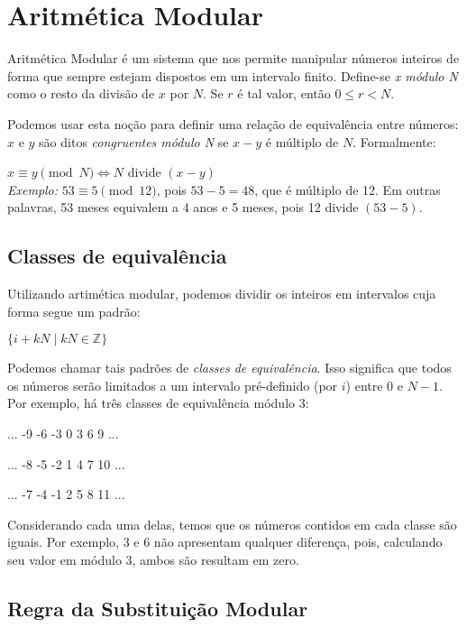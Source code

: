 \section*{Aritmética Modular}

Aritmética Modular é um sistema que nos permite manipular números inteiros de
forma que sempre estejam dispostos em um intervalo finito.
Define-se \textit{x módulo N} como o resto da divisão de $x$ por $N$. Se $r$ é
tal valor, então $0 \leq r < N$.

Podemos usar esta noção para definir uma relação de equivalência entre
números: $x$ e $y$ são ditos \textit{congruentes módulo N} se $x-y$ é múltiplo
de $N$. Formalmente:

$x \equiv y \pmod N \iff N$ divide $(x-y)$\\

\textit{Exemplo:} $53 \equiv 5 \pmod{12}$, pois $53-5 = 48$, que é múltiplo de
12. Em outras palavras, 53 meses equivalem a 4 anos e 5 meses, pois 12 divide
$(53-5)$.


\vspace{1.5em}
\subsection*{Classes de equivalência}

Utilizando artimética modular, podemos dividir os inteiros em intervalos cuja
forma segue um padrão:

\quad $\{i + kN \; | \; kN \in \mathbb{Z}\}$

Podemos chamar tais padrões de \textit{classes de equivalência}. Isso
significa que todos os números serão limitados a um intervalo pré-definido
(por $i$) entre $0$ e $N-1$. Por exemplo, há três classes de equivalência
módulo 3:

\quad ... -9 -6 -3 0 3 6 9 ...

\quad ... -8 -5 -2 1 4 7 10 ...

\quad ... -7 -4 -1 2 5 8 11 ...

Considerando cada uma delas, temos que os números contidos em cada classe são
iguais. Por exemplo, 3 e 6 não apresentam qualquer diferença, pois,
calculando seu valor em módulo 3, ambos são resultam em zero.


\subsection*{Regra da Substituição Modular}

